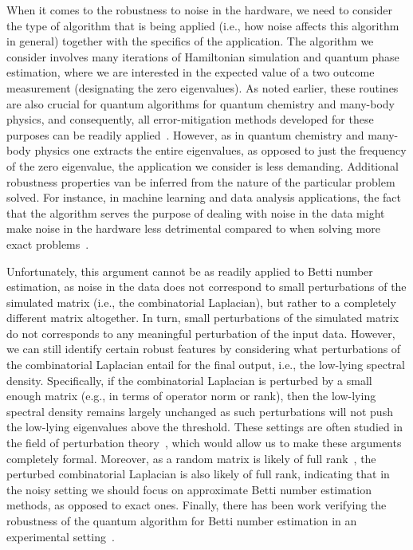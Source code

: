 \documentclass[a4paper, onecolumn, accepted=2022-08-28]{quantumarticle}
\begin{document}
When it comes to the robustness to noise in the hardware, we need to consider the type of algorithm that is being applied (i.e., how noise affects this algorithm in general) together with the specifics of the application.
The algorithm we consider involves many iterations of Hamiltonian simulation and quantum phase estimation, where we are interested in the expected value of a two outcome measurement (designating the zero eigenvalues).
As noted earlier, these routines are also crucial for quantum algorithms for quantum chemistry and many-body physics, and consequently, all error-mitigation methods developed for these purposes can be readily applied~\cite{temme:error, bonet:error, endo:error, mcardle:error, tom:error}.
However, as in quantum chemistry and many-body physics one extracts the entire eigenvalues, as opposed to just the frequency of the zero eigenvalue, the application we consider is less demanding.
Additional robustness properties van be inferred from the nature of the particular problem solved.
For instance, in machine learning and data analysis applications, the fact that the algorithm serves the purpose of dealing with noise in the data might make noise in the hardware less detrimental compared to when solving more exact problems~\cite{dunjko:review}.

Unfortunately, this argument cannot be as readily applied to Betti number estimation, as noise in the data does not correspond to small perturbations of the simulated matrix (i.e., the combinatorial Laplacian), but rather to a completely different matrix altogether.
In turn, small perturbations of the simulated matrix do not corresponds to any meaningful perturbation of the input data.
However, we can still identify certain robust features by considering what perturbations of the combinatorial Laplacian entail for the final output, i.e., the low-lying spectral density.
Specifically, if the combinatorial Laplacian is perturbed by a small enough matrix (e.g., in terms of operator norm or rank), then the low-lying spectral density remains largely unchanged as such perturbations will not push the low-lying eigenvalues above the threshold.
These settings are often studied in the field of perturbation theory~\cite{kato:perturbation}, which would allow us to make these arguments completely formal.
Moreover, as a random matrix is likely of full rank~\cite{feng:rank}, the perturbed combinatorial Laplacian is also likely of full rank, indicating that in the noisy setting we should focus on approximate Betti number estimation methods, as opposed to exact ones.
Finally, there has been work verifying the robustness of the quantum algorithm for Betti number estimation in an experimental setting~\cite{huang:demonstration}.
\end{document}

